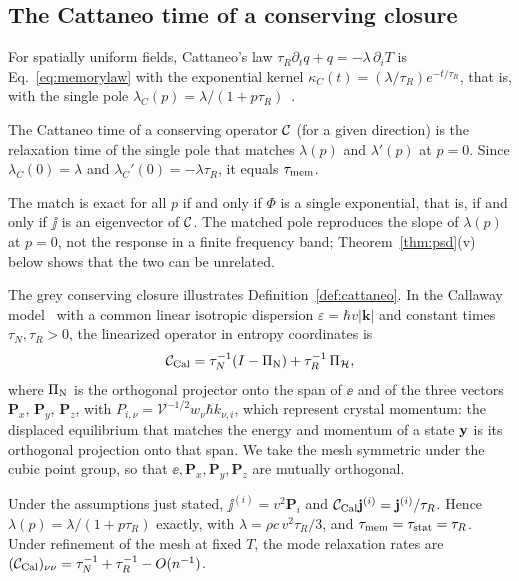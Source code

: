 \subsection{The Cattaneo time of a conserving closure}\label{sec:cattaneo}

For spatially uniform fields, Cattaneo's law $\tau_R\partial_tq+q=-\lambda\,\partial_iT$ is
Eq.~\eqref{eq:memorylaw} with the exponential kernel $\kappa_C(t)=(\lambda/\tau_R)e^{-t/\tau_R}$, that
is, with the single pole $\lambda_C(p)=\lambda/(1+p\tau_R)$~\cite{JosephPreziosi1989,GurtinPipkin1968}.

\begin{definition}\label{def:cattaneo}
The Cattaneo time of a conserving operator $\mathcal C$ (for a given direction) is the relaxation time of the
single pole that matches $\lambda(p)$ and $\lambda'(p)$ at $p=0$. Since $\lambda_C(0)=\lambda$ and
$\lambda_C'(0)=-\lambda\tau_R$, it equals $\tau_{\rm mem}$.
\end{definition}

The match is exact for all $p$ if and only if $\Phi$ is a single exponential, that is, if and only if
$\jj$ is an eigenvector of $\mathcal C$. The matched pole reproduces the slope of $\lambda(p)$ at $p=0$, not
the response in a finite frequency band; Theorem~\ref{thm:psd}(v) below shows that the two can be
unrelated.

The grey conserving closure illustrates Definition~\ref{def:cattaneo}. In the Callaway
model~\cite{Callaway1959} with a common linear isotropic dispersion $\varepsilon=\hbar v|\mathbf k|$
and constant times $\tau_N,\tau_R>0$, the linearized operator in entropy coordinates is
\begin{equation}
\mathcal C_{\rm Cal}=\tau_N^{-1}(I-\Pi_{\rm N})+\tau_R^{-1}\,\Pi_{\mathcal H},
\label{eq:callaway}
\end{equation}
where $\Pi_{\rm N}$ is the orthogonal projector onto the span of $\ee$ and of the three vectors
$\mathbf P_x$, $\mathbf P_y$, $\mathbf P_z$, with $P_{i,\nu}=\mathcal V^{-1/2}w_\nu\hbar k_{\nu,i}$,
which represent crystal momentum: the displaced
equilibrium that matches the energy and momentum of a state $\mathbf y$ is its orthogonal projection onto that
span. We take the mesh symmetric under the cubic point group, so that $\ee,\mathbf P_x,\mathbf P_y,\mathbf P_z$ are
mutually orthogonal.

\begin{proposition}\label{prop:callaway}
Under the assumptions just stated, $\jj^{(i)}=v^2\mathbf P_i$ and $\mathcal C_{\rm Cal}\mathbf j^{(i)}=\mathbf j^{(i)}/\tau_R$.
Hence $\lambda(p)=\lambda/(1+p\tau_R)$ exactly, with $\lambda=\rho c\,v^2\tau_R/3$, and
$\tau_{\rm mem}=\tau_{\rm stat}=\tau_R$. Under refinement of the mesh at fixed $T$, the mode relaxation rates are
$(\mathcal C_{\rm Cal})_{\nu\nu}=\tau_N^{-1}+\tau_R^{-1}-O(n^{-1})$.
\end{proposition}

